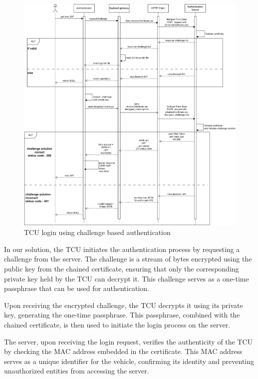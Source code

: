 \documentclass[
12pt,
oneside, 
onehalfspacing, 
nolistspacing, 
parskip, 
chapterinoneline, 
]{AASTCOMPUTER}
\begin{document}
\begin{figure}[!ht]
	\centering
	\includegraphics[scale=0.5]{Figures/Architicture/tcu_auth.png}
  	\caption{TCU login using challenge based authentication}
  	\label{fig:TCU login using challenge based authentication}
\end{figure}

In our solution, the TCU initiates the authentication process by requesting a challenge from the server. The challenge is a stream of bytes encrypted using the public key from the chained certificate, ensuring that only the corresponding private key held by the TCU can decrypt it. This challenge serves as a one-time passphrase that can be used for authentication.



Upon receiving the encrypted challenge, the TCU decrypts it using its private key, generating the one-time passphrase. This passphrase, combined with the chained certificate, is then used to initiate the login process on the server.

The server, upon receiving the login request, verifies the authenticity of the TCU by checking the MAC address embedded in the certificate. This MAC address serves as a unique identifier for the vehicle, confirming its identity and preventing unauthorized entities from accessing the server.
\end{document}
